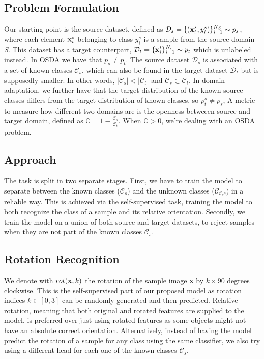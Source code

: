 \documentclass[10pt,twocolumn,letterpaper]{article}
\begin{document}
\subsection{Problem Formulation}
\label{sec:problemformulation}
Our starting point is the source dataset, 
defined as $\mathcal{D}_s = \{({\bf x}_i^s, y_i^s)\}_{i=1}^{N_S} \sim p_s$, 
where each element ${\bf x}_i^s$ belonging to class $y_i^s$ is a sample from the source domain {\it S}.
This dataset has a target counterpart, 
$\mathcal{D}_t = \{{\bf x}_i^t\}_{i=1}^{N_t} \sim p_t$ which is unlabeled instead.
In OSDA we have that $p_s \neq p_t$.
The source dataset $\mathcal{D}_s$ is associated with a set of known classes $\mathcal{C}_s$, 
which can also be found in the target dataset $\mathcal{D}_t$ but is supposedly smaller.
In other words,
$|\mathcal{C}_s| < |\mathcal{C}_t|$ and $\mathcal{C}_s \subset \mathcal{C}_t$.
In domain adaptation, 
we further have that the target distribution of the known source classes differs from the target distribution of known classes,
so $p_t^s \neq p_s$, 
A metric to measure how different two domains are is the openness betweeen source and target domain\cite{bendale2015open}, 
defined as $\displaystyle \mathbb{O} = 1-\frac{\mathcal{C}_s}{\mathcal{C}_t}$.
When $\mathbb{O} > 0$, we're dealing with an OSDA problem.

\subsection{Approach}
\label{sec:apporach}
The task is split in two separate stages.
First, 
we have to train the model to separate between the known classes ($\mathcal{C}_s$) and the unknown classes ($\mathcal{C}_{t\setminus s})$ in a reliable way.
This is achieved via the self-supervised task,
training the model to both recognize the class of a sample and its relative orientation.
Secondly,
we train the model on a union of both source and target datasets,
to reject samples when they are not part of the known classes $\mathcal{C}_s$.

\subsection{Rotation Recognition}

We denote with $rot({\bf x}, k)$ the rotation of the sample image {\bf x} by $k\times 90$ degrees clockwise.
This is the self-supervised part of our proposed model as rotation indices $k \in [0, 3]$ can be randomly generated and then predicted.
Relative rotation,
meaning that both original and rotated features are supplied to the model,
is preferred over just using rotated features as some objects might not have an absolute correct orientation.
Alternatively, 
instead of having the model predict the rotation of a sample for any class using the same classifier, 
we also try using a different head for each one of the known classes $\mathcal{C}_s$.
\end{document}

